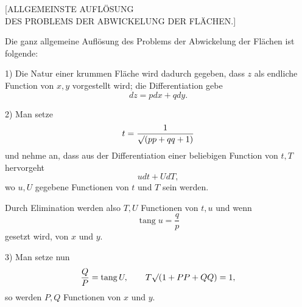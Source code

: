 \clearpage
{}
\begin{center}\large [ALLGEMEINSTE AUFLÖSUNG\\DES PROBLEMS DER ABWICKELUNG DER FLÄCHEN.]\end{center}
\noindent\hspace*{1.2em}Die ganz allgemeine Auflösung des Problems der Abwickelung der Flächen ist folgende:

1) Die Natur einer krummen Fläche wird dadurch gegeben, dass $z$ als endliche Function von $x,y$ vorgestellt wird; die Differentiation gebe
\[
dz=pdx+qdy.
\]

2) Man setze
\[
t=\frac{1}{\mathord{\surd}(pp+qq+1)}
\]
\noindent und nehme an, dass aus der Differentiation einer beliebigen Function von $t,T$ hervorgeht
\[
udt+UdT,
\]
\noindent wo $u,U$ gegebene Functionen von $t$ und $T$ sein werden.

Durch Elimination werden also $T,U$ Functionen von $t,u$ und wenn
\[
\operatorname{tang}u=\frac{q}{p}
\]
\noindent gesetzt wird, von $x$ und $y$.

3) Man setze nun
\[
\frac{Q}{P}=\operatorname{tang}U,\qquad
T\mathord{\surd}(1+PP+QQ)=1,
\]
\noindent so werden $P,Q$ Functionen von $x$ und $y$.

